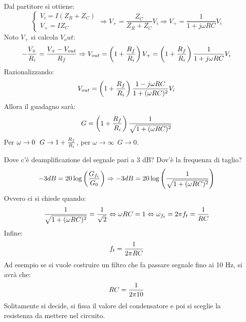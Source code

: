\documentclass[a4paper, 15pt]{article}
\begin{document}
\begin{adjustwidth}{2in}{}
   		\begin{figure}[H]
   			\centering
   		\end{figure}
   		
   		Dal partitore si ottiene: 
   		\[\begin{cases}
   			V_i = I(Z_R + Z_C) \\
   			V_+ = IZ_C
   		\end{cases} \Rightarrow V_+ = \dfrac{Z_C}{Z_R+Z_C}V_i \Rightarrow V_+ =\dfrac{1}{1+j\omega RC}V_i\]
   		Noto $V_+$ si calcola $V_out$:
   		\[-{V_+\over R_i} = {V_+-V_{out}\over R_f}\Rightarrow V_{out} = \left(1+{R_f\over R_i}\right)V_+ = \left(1+{R_f\over R_i}\right)\dfrac{1}{1+j\omega RC}V_i\]
   		Razionalizzando:
   		\[ V_{out} = \left(1+{R_f\over R_i}\right)\dfrac{1-j\omega RC}{1+(\omega RC)^2}V_i \]
   		Allora il guadagno sarà:
   		\[G = \left(1+{R_f\over R_i}\right) \dfrac{1}{\sqrt{1+(\omega RC)^2}}\]
   	\newpage
   		Per $\omega\rightarrow0 ~~ G\rightarrow 1+{R_f\over R_i}$, per $\omega\rightarrow\infty ~~ G\rightarrow0$.    		
   		\begin{figure}[H]
   			\centering
   		\end{figure}   		
   		Dove c'è deamplificazione del segnale pari a 3 dB? Dov'è la frequenza di taglio? 
   		\[-3 dB = 20\log\left(G_{f_t}\over G_0\right) \Rightarrow -3 dB = 20\log\left(\dfrac{1}{\sqrt{1+(\omega RC)^2}}\right)\]
   		Ovvero ci si chiede quando: 
   		\[\dfrac{1}{\sqrt{1+(\omega RC)^2}} = {1\over\sqrt{2}} \Leftrightarrow \omega RC = 1 \Leftrightarrow \omega_{f_t} = 2\pi f_t = {1\over RC}\]
   		Infine:
   		\[f_t = {1\over 2\pi RC}\]
   		Ad esempio se si vuole costruire un filtro che fa passare segnale fino ai 10 Hz, si avrà che:
   		\[RC = {1\over2\pi10}\]
   		Solitamente si decide, si fissa il valore del condensatore e poi si sceglie la resistenza da mettere nel circuito. \newline 
   		

\end{adjustwidth}
\end{document}
